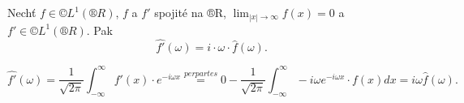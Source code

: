 \documentclass[12pt]{article}					%
\begin{document}
\begin{veta}
	Nechť $f \in ©L^1(®R)$, $f$ a $f'$ spojité na ®R, $\lim_{|x| \rightarrow ∞} f(x) = 0$ a $f' \in ©L^{1}(®R)$. Pak
	$$ \widehat{f'}(\omega) = i·\omega·\hat{f}(\omega). $$

	\begin{dukazin}
		$$ \widehat{f'}(\omega) = \frac{1}{\sqrt{2 \pi}}\int_{-∞}^∞ f'(x)·e^{-i\omega x} \overset{per partes}= 0 - \frac{1}{\sqrt{2\pi}} \int_{-∞}^{∞} -i\omega e^{-i \omega x} · f(x) dx = i\omega \hat{f}(\omega). $$
	\end{dukazin}
\end{veta}
\end{document}
